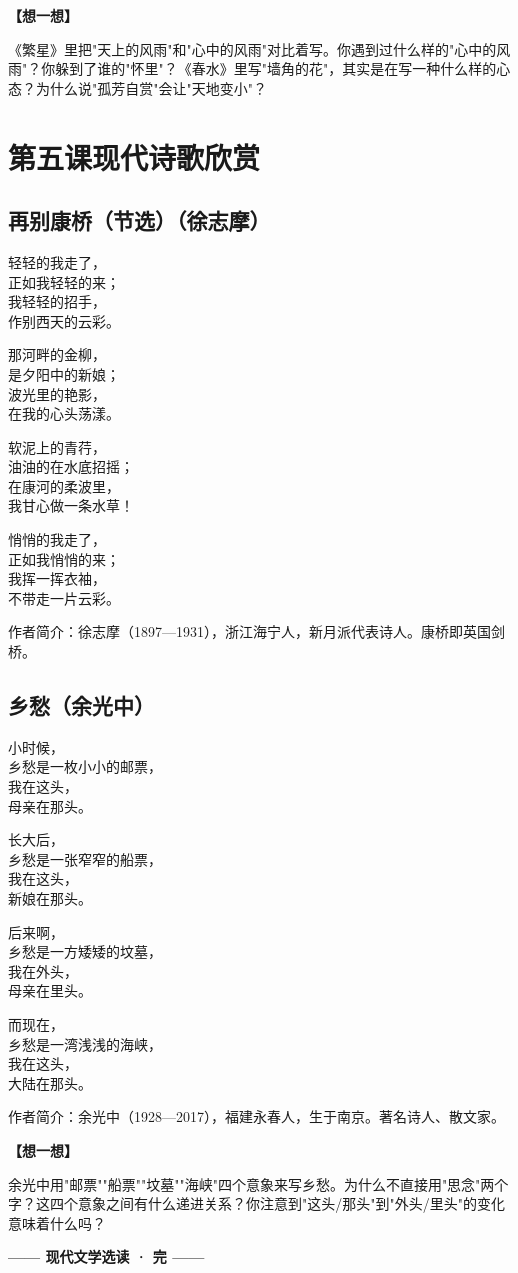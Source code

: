 \documentclass[a4paper,12pt]{ctexart}
\newcommand{\thinkq}{\vspace{0.2cm}\noindent\textcolor{orange!60!black}{\small\bfseries【想一想】}\par}
\newcommand{\authorinfo}[1]{{\vspace{0.1cm}\noindent\textcolor{blue!60!black}{\small #1}\par}}
\begin{document}
\thinkq 《繁星》里把"天上的风雨"和"心中的风雨"对比着写。你遇到过什么样的"心中的风雨"？你躲到了谁的"怀里"？《春水》里写"墙角的花"，其实是在写一种什么样的心态？为什么说"孤芳自赏"会让"天地变小"？

\newpage

\section{\textcolor{orange!80!black}{第五课\quad 现代诗歌欣赏}}

\subsection*{再别康桥（节选）（徐志摩）}

轻轻的我走了，\\
正如我轻轻的来；\\
我轻轻的招手，\\
作别西天的云彩。

那河畔的金柳，\\
是夕阳中的新娘；\\
波光里的艳影，\\
在我的心头荡漾。

软泥上的青荇，\\
油油的在水底招摇；\\
在康河的柔波里，\\
我甘心做一条水草！

悄悄的我走了，\\
正如我悄悄的来；\\
我挥一挥衣袖，\\
不带走一片云彩。

\authorinfo{作者简介：徐志摩（1897—1931），浙江海宁人，新月派代表诗人。康桥即英国剑桥。}

\subsection*{乡愁（余光中）}

小时候，\\
乡愁是一枚小小的邮票，\\
我在这头，\\
母亲在那头。

长大后，\\
乡愁是一张窄窄的船票，\\
我在这头，\\
新娘在那头。

后来啊，\\
乡愁是一方矮矮的坟墓，\\
我在外头，\\
母亲在里头。

而现在，\\
乡愁是一湾浅浅的海峡，\\
我在这头，\\
大陆在那头。

\authorinfo{作者简介：余光中（1928—2017），福建永春人，生于南京。著名诗人、散文家。}

\thinkq 余光中用"邮票""船票""坟墓""海峡"四个意象来写乡愁。为什么不直接用"思念"两个字？这四个意象之间有什么递进关系？你注意到"这头/那头"到"外头/里头"的变化意味着什么吗？

\vspace{0.5cm}

\begin{center}
\textcolor{blue!70!black}{\large\textbf{—— 现代文学选读 · 完 ——}}
\end{center}
\end{document}
